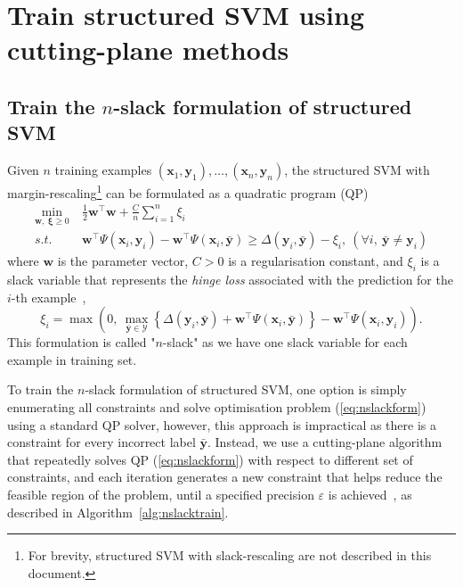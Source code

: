 \documentclass[9pt]{extarticle}
\newcommand{\eat}[1]{}
\begin{document}
\section{Train structured SVM using cutting-plane methods}
\label{sec:ssvm}


\subsection{Train the $n$-slack formulation of structured SVM}
\label{sec:nslackssvm}


Given $n$ training examples $(\mathbf{x}_1, \mathbf{y}_1), \dots, (\mathbf{x}_n, \mathbf{y}_n)$, 
the structured SVM with margin-rescaling\footnote{For brevity, structured SVM with slack-rescaling are not described in this document.}
can be formulated as a quadratic program (QP)
\begin{equation}
\label{eq:nslackform}
\begin{aligned}
\min_{\mathbf{w}, ~\bm{\xi} \ge 0} ~& \frac{1}{2} \mathbf{w}^\top \mathbf{w} + \frac{C}{n} \sum_{i=1}^n \xi_i \\
s.t.~~ ~& \mathbf{w}^\top \Psi(\mathbf{x}_i, \mathbf{y}_i) - \mathbf{w}^\top \Psi(\mathbf{x}_i, \bar{\mathbf{y}}) \ge 
       \Delta(\mathbf{y}_i, \bar{\mathbf{y}}) - \xi_i, ~(\forall i,~ \bar{\mathbf{y}} \neq \mathbf{y}_i)
\end{aligned}
\end{equation}
where $\mathbf{w}$ is the parameter vector, $C > 0$ is a regularisation constant, and $\xi_i$
is a slack variable that represents the \emph{hinge loss} associated with the prediction for the $i$-th example~\cite{tsochantaridis2005large},
\begin{equation}
\label{eq:nslackloss}
\xi_i = \max \left( 0,~ 
        \max_{\bar{\mathbf{y}} \in \mathcal{Y}} 
        \left\{ \Delta(\mathbf{y}_i, \bar{\mathbf{y}}) + \mathbf{w}^\top \Psi(\mathbf{x}_i, \bar{\mathbf{y}}) \right\} -
        \mathbf{w}^\top \Psi(\mathbf{x}_i, \mathbf{y}_i) \right).
\end{equation}
This formulation is called "$n$-slack" as we have one slack variable for each example in training set. \eat{citation}

To train the $n$-slack formulation of structured SVM, one option is simply enumerating all constraints and 
solve optimisation problem (\ref{eq:nslackform}) using a standard QP solver, 
however, this approach is impractical as there is a constraint for every incorrect label $\bar{\mathbf{y}}$.
Instead, we use a cutting-plane algorithm that repeatedly solves QP (\ref{eq:nslackform}) with respect to different set of constraints, 
and each iteration generates a new constraint that helps reduce the feasible region of the problem, 
until a specified precision $\varepsilon$ is achieved~\cite{joachims2009predicting}, as described in Algorithm~\ref{alg:nslacktrain}.
\end{document}
